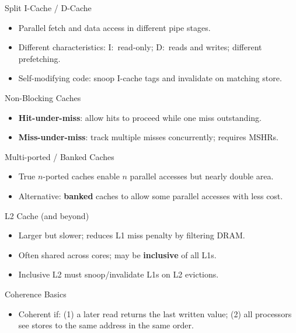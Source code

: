 \documentclass[aspectratio=169,12pt]{beamer}
\begin{document}
\begin{frame}{Split I-Cache / D-Cache}
\begin{itemize}
  \item Parallel fetch and data access in different pipe stages.
  \item Different characteristics: I$:$ read-only; D$:$ reads and writes; different prefetching.
  \item Self-modifying code: snoop I-cache tags and invalidate on matching store.
\end{itemize}
\end{frame}

\begin{frame}{Non-Blocking Caches}
\begin{itemize}
  \item \textbf{Hit-under-miss}: allow hits to proceed while one miss outstanding.
  \item \textbf{Miss-under-miss}: track multiple misses concurrently; requires MSHRs.
\end{itemize}
\end{frame}

\begin{frame}{Multi-ported / Banked Caches}
\begin{itemize}
  \item True $n$-ported caches enable $n$ parallel accesses but nearly double area.
  \item Alternative: \textbf{banked} caches to allow some parallel accesses with less cost.
\end{itemize}
\end{frame}

\begin{frame}{L2 Cache (and beyond)}
\begin{itemize}
  \item Larger but slower; reduces L1 miss penalty by filtering DRAM.
  \item Often shared across cores; may be \textbf{inclusive} of all L1s.
  \item Inclusive L2 must snoop/invalidate L1s on L2 evictions.
\end{itemize}
\end{frame}

\begin{frame}{Coherence Basics}
\begin{itemize}
  \item Coherent if: (1) a later read returns the last written value; (2) all processors see stores to the same address in the same order.
\end{itemize}
\end{frame}
\end{document}
